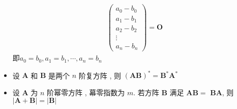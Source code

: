 \documentclass{article}
\begin{document}
\begin{itemize}
$$\begin{gathered}
					\left(\begin{array}{c}
						a_0-b_0\\a_1-b_1\\a_2-b_2\\ \vdots \\ a_n-b_n
					\end{array}\right)=\boldsymbol O
				\end{gathered}
				$$
				即$a_0=b_0,a_1=b_1,\cdots,a_n=b_n$
				\item 设 $\boldsymbol A$ 和 $\boldsymbol B$ 是两个 $n$ 阶复方阵 , 则 $(\boldsymbol A \boldsymbol B)^{*}=\boldsymbol B^{*} \boldsymbol A^{*}$
				\item 设 $\boldsymbol A$ 为 $n$ 阶幂零方阵 , 幕零指数为 $m$. 若方阵 $\boldsymbol B$ 满足 $\boldsymbol A \boldsymbol B=$ $\boldsymbol B \boldsymbol A$, 则 $|\boldsymbol A+\boldsymbol B|=|\boldsymbol B|$
			\end{itemize}
%
\end{document}
